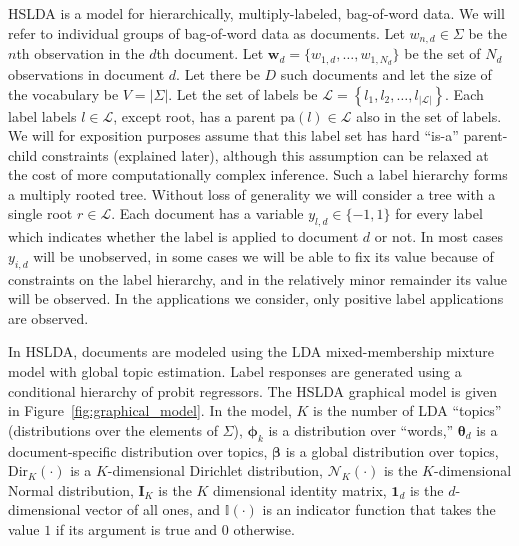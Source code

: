 HSLDA is a model for hierarchically, multiply-labeled, bag-of-word data.  We
will refer to individual groups of bag-of-word data as documents.  Let $w_{n,d}
\in \Sigma$ be the $n$th observation in the $d$th document.  Let $\mathbf{w}_d
= \{w_{1,d},\ldots,w_{1,N_d}\}$ be the  set of $N_d$ observations in document
$d$.  Let there be $D$ such documents and let the size of the vocabulary be
$V=|\Sigma|$.  Let the set of labels be $\mathcal{L}=\left\{
  l_{1},l_{2},\ldots,l_{\left|\mathcal{L}\right|}\right\} $. Each label labels
$l \in \mathcal{L}$, except root, has a parent $\mathrm{pa}(l) \in \mathcal{L}$
also in the set of labels. 
 We will for exposition purposes assume that this label set has hard ``is-a''
 parent-child constraints (explained later), although this assumption can be
 relaxed at the cost of more computationally complex inference.  Such a label hierarchy forms a multiply rooted tree.  Without loss of generality we will consider a tree with a single root $r\in\mathcal{L}$.  Each document has a variable $y_{l,d} \in \{-1,1\}$ for every label which indicates whether the label is applied to document $d$ or not.   In most cases $y_{i,d}$ will be unobserved, in some cases we will be able to fix its value because of  constraints on the label hierarchy, and in the relatively minor remainder its value will be observed.  In the applications we consider, only positive label applications are observed.  


In HSLDA, documents are modeled using the LDA mixed-membership mixture model
with global topic estimation. Label responses are generated using a conditional
hierarchy of probit regressors\cite{gelmanbda04}. The HSLDA graphical model is given in
Figure~\ref{fig:graphical_model}. In the model, $K$ is the number of LDA
``topics'' (distributions over the elements of $\Sigma$), $\boldsymbol\phi_k$
is a distribution over ``words,'' $\boldsymbol\theta_d$ is a document-specific
distribution over topics, $\boldsymbol\beta$ is a global distribution over
topics, Dir$_{K}(\cdot)$ is a $K$-dimensional Dirichlet distribution,
$\mathcal{N}_{K}(\cdot)$ is the $K$-dimensional Normal distribution,
$\mathbf{I}_{K}$ is the $K$ dimensional identity matrix,  $\mathbf{1}_d$ is the
$d$-dimensional vector of all ones, and $\mathbb{I}(\cdot)$ is an indicator
function that takes the value $1$ if its argument is true and $0$ otherwise. 

